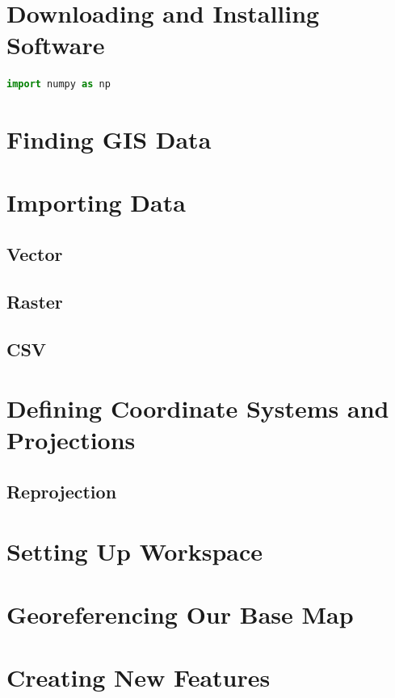 \documentclass{article}
\begin{document}
\section{Downloading and Installing Software}

\begin{lstlisting}[language=Python]
    import numpy as np
\end{lstlisting}

\section{Finding GIS Data}

\section{Importing Data}

\subsection{Vector}

\subsection{Raster}

\subsection{CSV}

\section{Defining Coordinate Systems and Projections}

\subsection{Reprojection}

\section{Setting Up Workspace}

\section{Georeferencing Our Base Map}

\section{Creating New Features}
\end{document}
